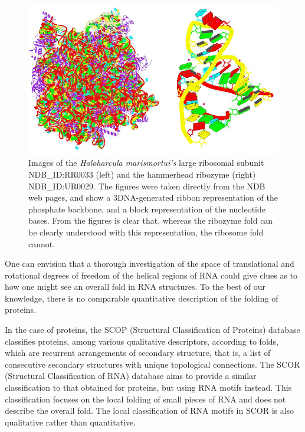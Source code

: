 \begin{figure}[t]
\centering
\includegraphics[scale=0.5]{Chapter1/ribosome_ribozyme.png}
\caption{Images   of  the  \textit{Haloharcula   marismortui's}  large
  ribosomal subunit NDB\_ID:RR0033 (left) and the hammerhead ribozyme
  (right) NDB\_ID:UR0029.
  The  figures were taken directly  from the NDB
  web  pages,   and  show  a  3DNA-generated  \cite{lu2008b}  ribbon
  representation of the phosphate backbone, and a block representation
  of the nucleotide bases. From  the figures is clear that, whereas
  the   ribozyme   fold   can   be  clearly   understood   with   this
  representation, the ribosome fold cannot.}
\label{fig:ribosome}
\end{figure}

One  can  envision that  a  thorough  investigation  of the  space  of
translational and rotational degrees of freedom of the helical regions
of RNA could give clues as to  how one might see an overall fold in RNA
structures.  To the  best  of  our knowledge,  there  is no  comparable
quantitative description of the folding of proteins.

In  the  case  of  proteins,  the SCOP  (Structural  Classification  of
Proteins)  database  \cite{andreeva2004}  classifies  proteins,  among
various  qualitative  descriptors,   according  to  folds,  which  are
recurrent  arrangements of  secondary structure,  that is,  a  list of
consecutive secondary structures  with unique topological connections.
The    SCOR    (Structural    Classification    of    RNA)    database
\cite{klosterman2002,  klosterman2004}  aims   to  provide  a  similar
classification  to that obtained  for proteins,  but using  RNA motifs
instead.  This  classification focuses on  the local folding  of small
pieces  of  RNA  and  does not  describe the  overall  fold.  The  local
classification of RNA  motifs in SCOR is also  qualitative rather than
quantitative.

